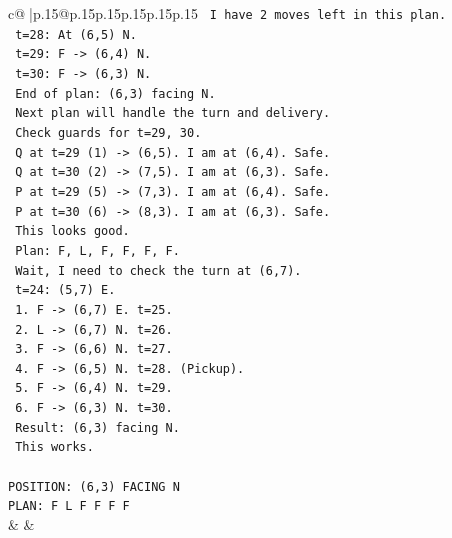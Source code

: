 \documentclass{article}
\begin{document}
{\begin{supertabular}{c@{$\;$}|p{.15\linewidth}@{}p{.15\linewidth}p{.15\linewidth}p{.15\linewidth}p{.15\linewidth}p{.15\linewidth}}
{{{\texttt{   I have 2 moves left in this plan.} \\
\texttt{   t=28: At (6,5) N.} \\
\texttt{   t=29: F {-}> (6,4) N.} \\
\texttt{   t=30: F {-}> (6,3) N.} \\
\texttt{   End of plan: (6,3) facing N.} \\
\texttt{   Next plan will handle the turn and delivery.} \\
\texttt{   Check guards for t=29, 30.} \\
\texttt{   Q at t=29 (1) {-}> (6,5). I am at (6,4). Safe.} \\
\texttt{   Q at t=30 (2) {-}> (7,5). I am at (6,3). Safe.} \\
\texttt{   P at t=29 (5) {-}> (7,3). I am at (6,4). Safe.} \\
\texttt{   P at t=30 (6) {-}> (8,3). I am at (6,3). Safe.} \\
\texttt{   This looks good.} \\
\texttt{   Plan: F, L, F, F, F, F.} \\
\texttt{   Wait, I need to check the turn at (6,7).} \\
\texttt{   t=24: (5,7) E.} \\
\texttt{   1. F {-}> (6,7) E. t=25.} \\
\texttt{   2. L {-}> (6,7) N. t=26.} \\
\texttt{   3. F {-}> (6,6) N. t=27.} \\
\texttt{   4. F {-}> (6,5) N. t=28. (Pickup).} \\
\texttt{   5. F {-}> (6,4) N. t=29.} \\
\texttt{   6. F {-}> (6,3) N. t=30.} \\
\texttt{   Result: (6,3) facing N.} \\
\texttt{   This works.} \\
\\ 
\texttt{POSITION: (6,3) FACING N} \\
\texttt{PLAN: F L F F F F} \\
            }
        }
    }
    & & \\ \\


\end{supertabular}}
\end{document}
